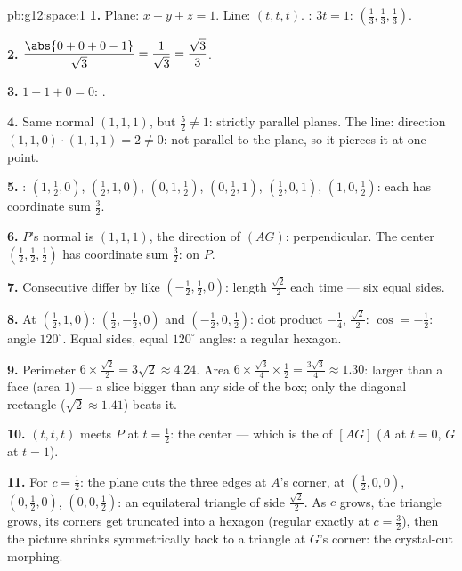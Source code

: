 \begin{solution}{pb:g12:space:1}
\textbf{1.} Plane: $x + y + z = 1$. Line: $(t, t, t)$.
: $3t = 1$:
$\left(\frac13, \frac13, \frac13\right)$.

\textbf{2.} $\dfrac{\abs{0 + 0 + 0 - 1}}{\sqrt3} =
\dfrac{1}{\sqrt3} = \dfrac{\sqrt3}{3}$.

\textbf{3.} $1 - 1 + 0 = 0$: .

\textbf{4.} Same normal $(1,1,1)$, but $\frac52 \neq 1$:
strictly parallel planes. The line: direction
$(1,1,0) \cdot (1,1,1) = 2 \neq 0$: not parallel to the plane,
so it pierces it at one point.

\textbf{5.} : $\left(1, \frac12, 0\right)$,
$\left(\frac12, 1, 0\right)$, $\left(0, 1, \frac12\right)$,
$\left(0, \frac12, 1\right)$, $\left(\frac12, 0, 1\right)$,
$\left(1, 0, \frac12\right)$: each has coordinate sum
$\frac32$.

\textbf{6.} $P$'s normal is $(1,1,1)$, the direction of
$(AG)$: perpendicular. The center
$\left(\frac12,\frac12,\frac12\right)$ has coordinate sum
$\frac32$: on $P$.

\textbf{7.} Consecutive  differ by  like
$\left(-\frac12, \frac12, 0\right)$: length
$\frac{\sqrt2}{2}$ each time --- six equal sides.

\textbf{8.} At $\left(\frac12, 1, 0\right)$: 
$\left(\frac12, -\frac12, 0\right)$ and
$\left(-\frac12, 0, \frac12\right)$: dot product $-\frac14$,
 $\frac{\sqrt2}{2}$: $\cos = -\frac12$: angle
$120^\circ$. Equal sides, equal $120^\circ$ angles: a regular
hexagon.

\textbf{9.} Perimeter $6 \times \frac{\sqrt2}{2} = 3\sqrt2
\approx 4.24$. Area $6 \times \frac{\sqrt3}{4} \times
\frac12 = \frac{3\sqrt3}{4} \approx 1.30$: larger than a face
(area $1$) --- a slice bigger than any side of the box; only
the diagonal rectangle ($\sqrt2 \approx 1.41$) beats it.

\textbf{10.} $(t,t,t)$ meets $P$ at $t = \frac12$: the center
--- which is the  of $[AG]$ ($A$ at $t = 0$, $G$ at
$t = 1$).

\textbf{11.} For $c = \frac12$: the plane cuts the three edges
at $A$'s corner, at $\left(\frac12,0,0\right)$,
$\left(0,\frac12,0\right)$, $\left(0,0,\frac12\right)$: an
equilateral triangle of side $\frac{\sqrt2}{2}$. As $c$ grows,
the triangle grows, its corners get truncated into a hexagon
(regular exactly at $c = \frac32$), then the picture shrinks
symmetrically back to a triangle at $G$'s corner: the
crystal-cut morphing.


\end{solution}
